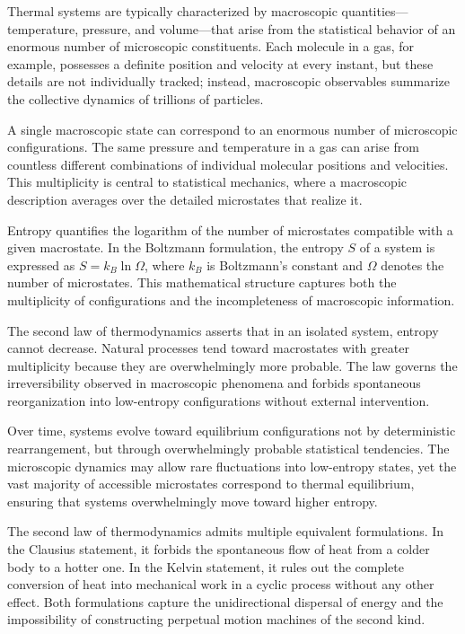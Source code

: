 Thermal systems are typically characterized by macroscopic quantities—temperature, pressure, and volume—that arise from the statistical behavior of an enormous number of microscopic constituents. Each molecule in a gas, for example, possesses a definite position and velocity at every instant, but these details are not individually tracked; instead, macroscopic observables summarize the collective dynamics of trillions of particles.

A single macroscopic state can correspond to an enormous number of microscopic configurations. The same pressure and temperature in a gas can arise from countless different combinations of individual molecular positions and velocities. This multiplicity is central to statistical mechanics, where a macroscopic description averages over the detailed microstates that realize it.

Entropy quantifies the logarithm of the number of microstates compatible with a given macrostate. In the Boltzmann formulation, the entropy $S$ of a system is expressed as $S = k_B \ln \Omega$, where $k_B$ is Boltzmann’s constant and $\Omega$ denotes the number of microstates. This mathematical structure captures both the multiplicity of configurations and the incompleteness of macroscopic information.

The second law of thermodynamics asserts that in an isolated system, entropy cannot decrease. Natural processes tend toward macrostates with greater multiplicity because they are overwhelmingly more probable. The law governs the irreversibility observed in macroscopic phenomena and forbids spontaneous reorganization into low-entropy configurations without external intervention.


Over time, systems evolve toward equilibrium configurations not by deterministic rearrangement, but through overwhelmingly probable statistical tendencies. The microscopic dynamics may allow rare fluctuations into low-entropy states, yet the vast majority of accessible microstates correspond to thermal equilibrium, ensuring that systems overwhelmingly move toward higher entropy.

The second law of thermodynamics admits multiple equivalent formulations. In the Clausius statement, it forbids the spontaneous flow of heat from a colder body to a hotter one. In the Kelvin statement, it rules out the complete conversion of heat into mechanical work in a cyclic process without any other effect. Both formulations capture the unidirectional dispersal of energy and the impossibility of constructing perpetual motion machines of the second kind.

